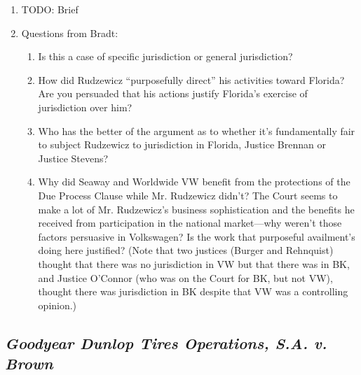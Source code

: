 \begin{enumerate}
    \item TODO: Brief
    \item Questions from Bradt:
    \begin{enumerate}
        \item Is this a case of specific jurisdiction or general jurisdiction?
        \item How did Rudzewicz ``purposefully direct'' his activities toward Florida? Are you persuaded that his actions justify Florida's exercise of jurisdiction over him?
        \item Who has the better of the argument as to whether it's fundamentally fair to subject Rudzewicz to jurisdiction in Florida, Justice Brennan or Justice Stevens?
        \item Why did Seaway and Worldwide VW benefit from the protections of the Due Process Clause while Mr. Rudzewicz didn't? The Court seems to make a lot of Mr. Rudzewicz's business sophistication and the benefits he received from participation in the national market---why weren't those factors persuasive in Volkswagen? Is the work that purposeful availment's doing here justified? (Note that two justices (Burger and Rehnquist) thought that there was no jurisdiction in VW but that there was in BK, and Justice O'Connor (who was on the Court for BK, but not VW), thought there was jurisdiction in BK despite that VW was a controlling opinion.)
    \end{enumerate}
\end{enumerate}

\subsection{\emph{Goodyear Dunlop Tires Operations, S.A. v. Brown}}

